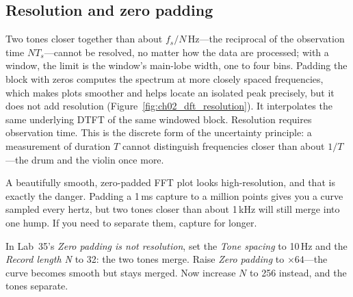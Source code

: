 
\subsection{Resolution and zero padding}

Two tones closer together than about $f_s/N$\,Hz---the reciprocal of the observation time
$NT_s$---cannot be resolved, no matter how the data are processed; with a window, the limit is the
window's main-lobe width, one to four bins. Padding the block with zeros computes the spectrum at more
closely spaced frequencies, which makes plots smoother and helps locate an isolated peak precisely,
but it does not add resolution (Figure~\ref{fig:ch02_dft_resolution}). It interpolates the same
underlying DTFT of the same windowed block. Resolution requires observation time. This is the
discrete form of the uncertainty principle: a measurement of duration $T$ cannot distinguish
frequencies closer than about $1/T$---the drum and the violin once more.


\begin{pitfall}
A beautifully smooth, zero-padded FFT plot looks high-resolution, and that is exactly the danger.
Padding a 1\,ms capture to a million points gives you a curve sampled every hertz, but two tones
closer than about 1\,kHz will still merge into one hump. If you need to separate them, capture for
longer.
\end{pitfall}

\begin{tryit}
In Lab~35's \emph{Zero padding is not resolution}, set the \emph{Tone spacing} to 10\,Hz and the
\emph{Record length N} to 32: the two tones merge. Raise \emph{Zero padding} to $\times64$---the
curve becomes smooth but stays merged. Now increase $N$ to 256 instead, and the tones separate.
\end{tryit}

